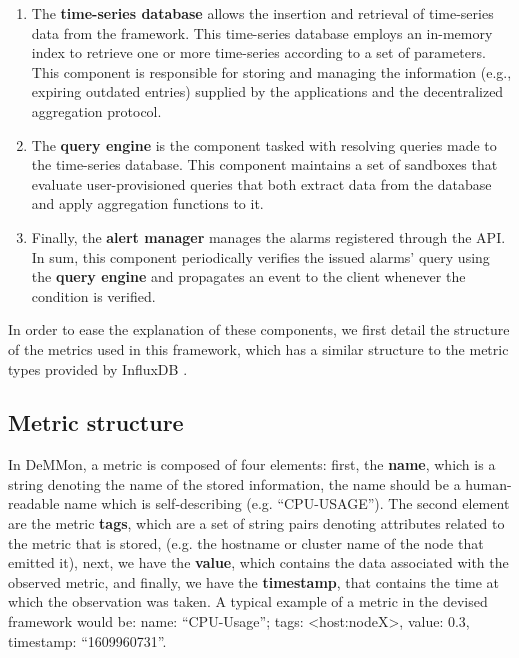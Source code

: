 \begin{enumerate}
    
    \item The \textbf{time-series database} allows the insertion and retrieval of time-series data from the framework. This time-series database employs an in-memory index to retrieve one or more time-series according to a set of parameters. This component is responsible for storing and managing the information (e.g., expiring outdated entries) supplied by the applications and the decentralized aggregation protocol.

    \item The \textbf{query engine} is the component tasked with resolving queries made to the time-series database. This component maintains a set of sandboxes that evaluate user-provisioned queries that both extract data from the database and apply aggregation functions to it.
    
    \item Finally, the \textbf{alert manager} manages the alarms registered through the API. In sum, this component periodically verifies the issued alarms' query using the \textbf{query engine} and propagates an event to the client whenever the condition is verified.
     
\end{enumerate}

In order to ease the explanation of these components, we first detail the structure of the metrics used in this framework, which has a similar structure to the metric types provided by InfluxDB \cite{influxdb_data_elements}. 

\subsection{Metric  structure}

In DeMMon, a metric is composed of four elements: first, the \textbf{name}, which is a string denoting the name of the stored information, the name should be a human-readable name which is self-describing (e.g. ``CPU-USAGE''). The second element are the metric \textbf{tags}, which are a set of string pairs denoting attributes related to the metric that is stored, (e.g. the hostname or cluster name of the node that emitted it), next, we have the \textbf{value}, which contains the data associated with the observed metric, and finally, we have the  \textbf{timestamp}, that contains the time at which the observation was taken. A typical example of a metric in the devised framework would be: name: ``CPU-Usage''; tags: <host:nodeX>, value: 0.3, timestamp: ``1609960731''.

